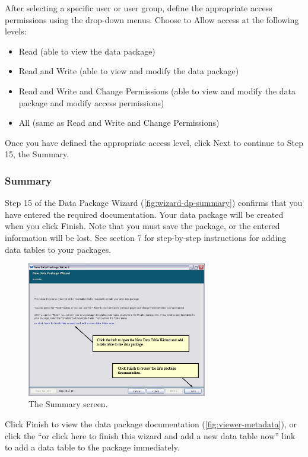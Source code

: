 After selecting a specific user or user group, define the appropriate
access permissions using the drop-down menus. Choose to Allow access at 
the following levels:
\begin{itemize}
  \setlength{\parskip}{1pt}
  \item Read (able to view the data package)
  \item Read and Write (able to view and modify the data package)
  \item Read and Write and Change Permissions (able to view and modify
    the data package and modify access permissions)
  \item All  (same as Read and Write and Change Permissions)
\end{itemize}

Once you have defined the appropriate access level, click Next to
continue to Step 15, the Summary.

\subsubsection{Summary} \label{sec:wizard-dp-summary}

Step 15 of the Data Package Wizard (\autoref{fig:wizard-dp-summary})
confirms that you have entered the required documentation. Your data
package will be created when you click Finish. Note that you must save
the package, or the entered information will be lost.  See section 7 for
step-by-step instructions for adding data tables to your packages.

\begin{figure}
  \centering
    \includegraphics[width=0.7\textwidth]{images/wizard-dp-summary.jpg}
  \caption{The Summary screen.}
  \label{fig:wizard-dp-summary}
\end{figure}

Click Finish to view the data package documentation
(\autoref{fig:viewer-metadata}), or click the ``or click here to finish
this wizard and add a new data table now'' link to add a data table to
the package immediately.

